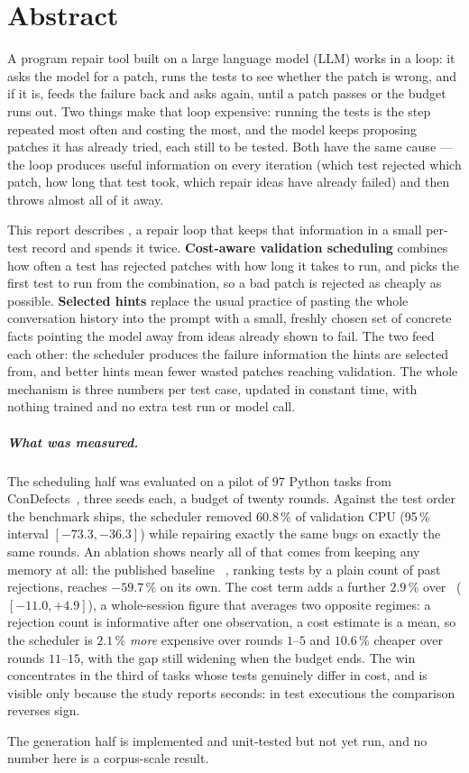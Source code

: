 \chapter*{Abstract}

A program repair tool built on a large language model (LLM) works in a loop:
it asks the model for a patch, runs the tests to see whether the patch is
wrong, and if it is, feeds the failure back and asks again, until a patch
passes or the budget runs out. Two things make that loop expensive: running
the tests is the step repeated most often and costing the most, and the model
keeps proposing patches it has already tried, each still to be tested. Both have the same cause --- the loop produces
useful information on every iteration (which test rejected which patch, how
long that test took, which repair ideas have already failed) and then throws
almost all of it away.

This report describes \caster, a repair loop that keeps that information in a
small per-test record and spends it twice. \textbf{Cost-aware validation
scheduling} combines how often a test has rejected patches with how long it
takes to run, and picks the first test to run from the combination, so a bad
patch is rejected as cheaply as possible. \textbf{Selected hints} replace
the usual practice of pasting the whole conversation history into the prompt
with a small, freshly chosen set of concrete facts pointing the model away
from ideas already shown to fail. The two feed each other: the scheduler
produces the failure information the hints are selected from, and better hints
mean fewer wasted patches reaching validation. The whole mechanism is three
numbers per test case, updated in constant time, with nothing trained and no
extra test run or model call.

\paragraph{What was measured.} The scheduling half was evaluated on a pilot of
$97$ Python tasks from ConDefects~\citep{wu2024condefects}, three seeds each,
a budget of twenty rounds. Against the test order the benchmark ships, the
scheduler removed $\mathbf{60.8\,\%}$ of validation CPU (95\,\% interval
$[-73.3, -36.3]$) while repairing exactly the same bugs on exactly the same
rounds. An ablation shows nearly all of that comes from keeping any memory at
all: the published baseline \frtp~\citep{qi2013frtp}, ranking tests by a plain
count of past rejections, reaches $-59.7\,\%$ on its own. The cost term adds
a further $2.9\,\%$ over \frtp\ ($[-11.0, +4.9]$), a whole-session figure
that averages two opposite regimes: a rejection count is informative after one
observation, a cost estimate is a mean, so the scheduler is $2.1\,\%$
\emph{more} expensive over rounds $1$--$5$ and $10.6\,\%$ cheaper over rounds
$11$--$15$, with the gap still widening when the budget ends. The win
concentrates in the third of tasks whose tests genuinely differ in cost, and
is visible only because the study reports seconds: in test executions the
comparison reverses sign.

The generation half is implemented and unit-tested but not yet run, and no
number here is a corpus-scale result.
